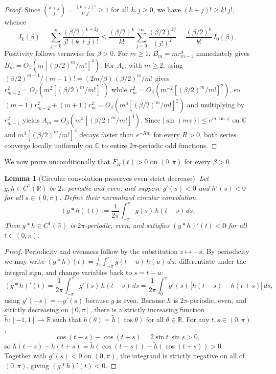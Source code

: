 \documentclass[11pt]{article}
\newtheorem{lemma}[theorem]{Lemma}
\theoremstyle{remark}
\begin{document}
\begin{proof}
Since $\binom{k+j}{j} = \frac{(k+j)!}{k!\,j!} \ge 1$ for all $k,j \ge 0$, we have
$(k+j)! \ge k!\,j!$, whence
\[
I_k(\beta) = \sum_{j=0}^\infty \frac{(\beta/2)^{k+2j}}{j!\,(k+j)!}
\le \frac{(\beta/2)^k}{k!}\sum_{j=0}^\infty \frac{(\beta/2)^{2j}}{(j!)^2}
= \frac{(\beta/2)^k}{k!}\,I_0(\beta).
\]
Positivity follows termwise for $\beta > 0$. For $m \ge 1$, $B_m = m r_{m-1}^4$ immediately
gives $B_m = O_\beta(m [(\beta/2)^m/m!]^4)$. For $A_m$ with $m \ge 2$, using
$(\beta/2)^{m-1}/(m-1)! = (2m/\beta)\,(\beta/2)^m/m!$ gives
$r_{m-2}^2 = O_\beta(m^2 [(\beta/2)^m/m!]^2)$ while
$r_m^2 = O_\beta(m^{-2} [(\beta/2)^m/m!]^2)$, so
$(m-1)r_{m-2}^2 + (m+1)r_m^2 = O_\beta(m^3 [(\beta/2)^m/m!]^2)$ and multiplying by
$r_{m-1}^2$ yields $A_m = O_\beta(m^3 [(\beta/2)^m/m!]^4)$. Since
$|\sin(mz)| \le e^{m|\operatorname{Im} z|}$ on $\mathbb{C}$ and $m^3[(\beta/2)^m/m!]^4$
decays faster than $e^{-Rm}$ for every $R > 0$, both series converge locally uniformly on
$\mathbb{C}$ to entire $2\pi$-periodic odd functions.
\end{proof}

We now prove unconditionally that $F_B(t) > 0$ on $(0,\pi)$ for every $\beta > 0$.

\begin{lemma}[Circular convolution preserves even strict decrease]
\label{lem:conv-dec}
Let $g, h \in C^1(\mathbb{R})$ be $2\pi$-periodic and even, and suppose $g'(s) < 0$ and
$h'(s) < 0$ for all $s \in (0,\pi)$. Define their normalized circular convolution
\[
(g * h)(t) := \frac{1}{2\pi}\int_{-\pi}^{\pi} g(s)\,h(t-s)\,ds.
\]
Then $g * h \in C^1(\mathbb{R})$ is $2\pi$-periodic, even, and satisfies
$(g * h)'(t) < 0$ for all $t \in (0,\pi)$.
\end{lemma}

\begin{proof}
Periodicity and evenness follow by the substitution $s \mapsto -s$. By periodicity we may
write $(g*h)(t) = \frac{1}{2\pi}\int_{-\pi}^{\pi} g(t-u)\,h(u)\,du$, differentiate under the
integral sign, and change variables back to $s = t-u$:
\[
(g*h)'(t) = \frac{1}{2\pi}\int_{-\pi}^{\pi} g'(s)\,h(t-s)\,ds
= \frac{1}{2\pi}\int_{0}^{\pi} g'(s)\,\bigl[h(t-s) - h(t+s)\bigr]\,ds,
\]
using $g'(-s) = -g'(s)$ because $g$ is even. Because $h$ is $2\pi$-periodic, even, and
strictly decreasing on $[0,\pi]$, there is a strictly increasing function
$\tilde{h} : [-1,1] \to \mathbb{R}$ such that $h(\theta) = \tilde{h}(\cos\theta)$ for all
$\theta \in \mathbb{R}$. For any $t, s \in (0,\pi)$,
\[
\cos(t-s) - \cos(t+s) = 2\sin t\,\sin s > 0,
\]
so $h(t-s) - h(t+s) = \tilde{h}(\cos(t-s)) - \tilde{h}(\cos(t+s)) > 0$. Together with
$g'(s) < 0$ on $(0,\pi)$, the integrand is strictly negative on all of $(0,\pi)$, giving
$(g*h)'(t) < 0$.
\end{proof}
\end{document}
